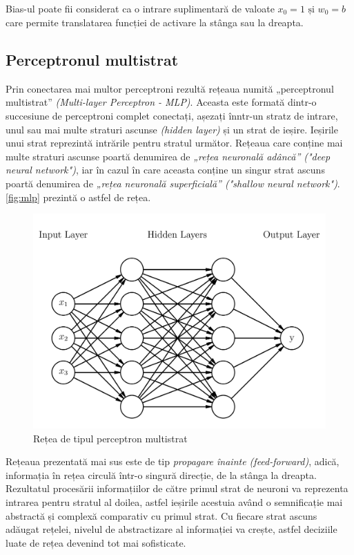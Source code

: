 Bias-ul poate fii considerat ca o intrare suplimentară de valoate $x_0 = 1 \text{ și } w_0 = b$ care permite translatarea funcției de activare la stânga sau la dreapta.

\subsection{Perceptronul multistrat}\label{subsec:mlp}
Prin conectarea mai multor perceptroni rezultă rețeaua numită „perceptronul multistrat” \textit{(Multi-layer Perceptron - MLP)}. Aceasta este formată dintr-o succesiune de perceptroni complet conectați, așezați înntr-un stratz de intrare, unul sau mai multe straturi ascunse \textit{(hidden layer)} și un strat de ieșire. Ieșirile unui strat reprezintă intrările pentru stratul următor. Rețeaua care conține mai multe straturi ascunse poartă denumirea de \textit{„rețea neuronală adâncă” ("deep neural network")}, iar în cazul în care aceasta conține un singur strat ascuns poartă denumirea de \textit{„rețea neuronală superficială” ("shallow neural network")}. \autoref{fig:mlp} prezintă o astfel de rețea.

\begin{figure}[ht]
\center
\includegraphics[width=\textwidth, keepaspectratio]{fig/cap2/mlp.png}
\caption{Rețea de tipul perceptron multistrat}
\label{fig:mlp}
\end{figure}

Rețeaua prezentată mai sus este de tip \textit{propagare înainte (feed-forward)}, adică, informația în rețea circulă într-o singură direcție, de la stânga la dreapta. Rezultatul procesării informațiilor de către primul strat de neuroni va reprezenta intrarea pentru stratul al doilea, astfel ieșirile acestuia având o semnificație mai abstractă și complexă comparativ cu primul strat. Cu fiecare strat ascuns adăugat rețelei, nivelul de abstractizare al informației va crește, astfel deciziile luate de rețea devenind tot mai sofisticate.

